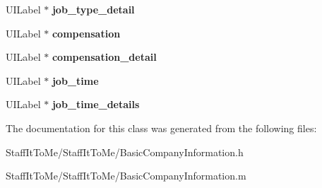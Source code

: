 \begin{DoxyCompactItemize}
\item 
\hypertarget{interface_basic_company_information_a6824716606e9035f0129b97f3b6dff73}{
\-U\-I\-Label $\ast$ {\bfseries job\-\_\-type\-\_\-detail}}
\label{interface_basic_company_information_a6824716606e9035f0129b97f3b6dff73}

\item 
\hypertarget{interface_basic_company_information_a800bf0b9208ebc4c2c64b5ea27a008e5}{
\-U\-I\-Label $\ast$ {\bfseries compensation}}
\label{interface_basic_company_information_a800bf0b9208ebc4c2c64b5ea27a008e5}

\item 
\hypertarget{interface_basic_company_information_a41224ca6dcbed49aaadc1bc2574d01d3}{
\-U\-I\-Label $\ast$ {\bfseries compensation\-\_\-detail}}
\label{interface_basic_company_information_a41224ca6dcbed49aaadc1bc2574d01d3}

\item 
\hypertarget{interface_basic_company_information_a6ab059f132190cad68867b419b174efb}{
\-U\-I\-Label $\ast$ {\bfseries job\-\_\-time}}
\label{interface_basic_company_information_a6ab059f132190cad68867b419b174efb}

\item 
\hypertarget{interface_basic_company_information_a8e7008ece450b7fdaa332ec23ecab97d}{
\-U\-I\-Label $\ast$ {\bfseries job\-\_\-time\-\_\-details}}
\label{interface_basic_company_information_a8e7008ece450b7fdaa332ec23ecab97d}

\end{DoxyCompactItemize}


\-The documentation for this class was generated from the following files\-:\begin{DoxyCompactItemize}
\item 
\-Staff\-It\-To\-Me/\-Staff\-It\-To\-Me/\-Basic\-Company\-Information.\-h\item 
\-Staff\-It\-To\-Me/\-Staff\-It\-To\-Me/\-Basic\-Company\-Information.\-m\end{DoxyCompactItemize}
